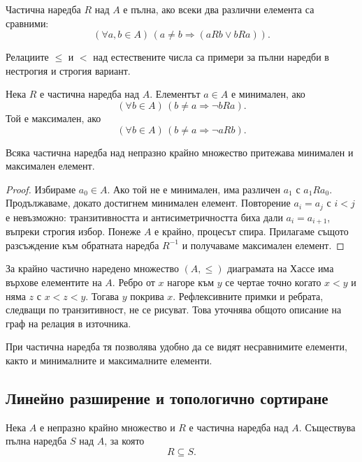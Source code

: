 \begin{keydefn}
Частична наредба $R$ над $A$ е пълна, ако всеки два различни елемента са сравними:
\[
(\forall a,b\in A)\,
\left(a\neq b\Rightarrow(aRb\lor bRa)\right).
\]
\end{keydefn}

Релациите $\leq$ и $<$ над естествените числа са примери за пълни наредби в нестрогия и строгия вариант.

\begin{keydefn}
Нека $R$ е частична наредба над $A$. Елементът $a\in A$ е минимален, ако
\[
(\forall b\in A)\,(b\neq a\Rightarrow\neg bRa).
\]
Той е максимален, ако
\[
(\forall b\in A)\,(b\neq a\Rightarrow\neg aRb).
\]
\end{keydefn}

\begin{thm}
Всяка частична наредба над непразно крайно множество притежава минимален и максимален елемент.
\end{thm}

\begin{proof}
Избираме $a_0\in A$. Ако той не е минимален, има различен $a_1$ с $a_1Ra_0$. Продължаваме, докато достигнем минимален елемент. Повторение $a_i=a_j$ с $i<j$ е невъзможно: транзитивността и антисиметричността биха дали $a_i=a_{i+1}$, въпреки строгия избор. Понеже $A$ е крайно, процесът спира. Прилагаме същото разсъждение към обратната наредба $R^{-1}$ и получаваме максимален елемент.
\end{proof}

\begin{keydefn}
За крайно частично наредено множество $(A,\le)$ диаграмата на Хассе има върхове елементите на $A$. Ребро от $x$ нагоре към $y$ се чертае точно когато $x<y$ и няма $z$ с $x<z<y$. Тогава $y$ покрива $x$. Рефлексивните примки и ребрата, следващи по транзитивност, не се рисуват. Това уточнява общото описание на граф на релация в източника.
\end{keydefn}

При частична наредба тя позволява удобно да се видят несравнимите елементи, както и минималните и максималните елементи.

\subsection{Линейно разширение и топологично сортиране}\label{s:1.5.4}

\begin{keythm}
Нека $A$ е непразно крайно множество и $R$ е частична наредба над $A$. Съществува пълна наредба $S$ над $A$, за която
\[
R\subseteq S.
\]
\end{keythm}

